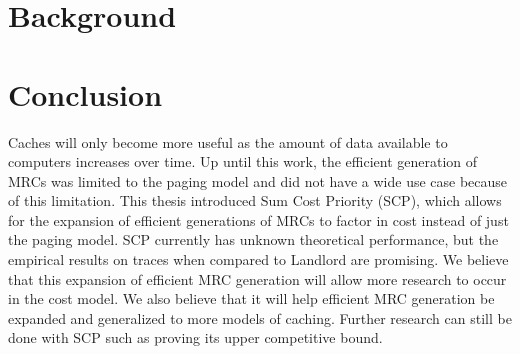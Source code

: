 \documentclass[12pt,twoside]{reedthesis}
\begin{document}



\chapter{Background}







 

\chapter*{Conclusion}
	\setcounter{chapter}{6}
	\setcounter{section}{0}

    Caches will only become more useful as the amount of data available to computers increases over time. Up until this work, the efficient generation of MRCs was limited to the paging model and did not have a wide use case because of this limitation. This thesis introduced Sum Cost Priority (SCP), which allows for the expansion of efficient generations of MRCs to factor in cost instead of just the paging model. SCP currently has unknown theoretical performance, but the empirical results on traces when compared to Landlord are promising. We believe that this expansion of efficient MRC generation will allow more research to occur in the cost model. We also believe that it will help efficient MRC generation be expanded and generalized to more models of caching. Further research can still be done with SCP such as proving its upper competitive bound. 
\end{document}

